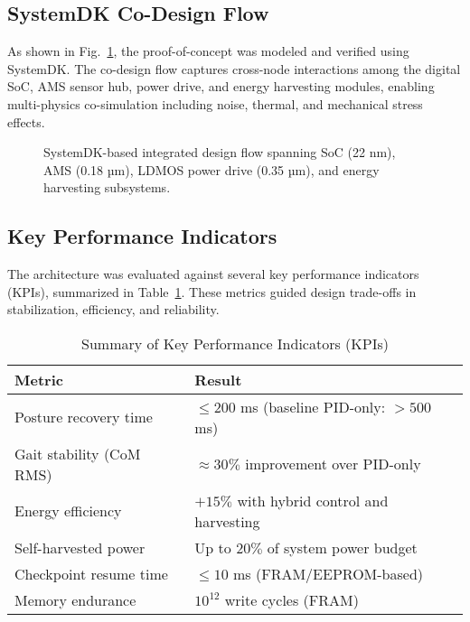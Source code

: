 \subsection{SystemDK Co-Design Flow}
As shown in Fig.~\ref{fig:systemdk_flow}, the proof-of-concept was modeled and verified
using SystemDK. The co-design flow captures cross-node interactions among the digital SoC,
AMS sensor hub, power drive, and energy harvesting modules, enabling multi-physics
co-simulation including noise, thermal, and mechanical stress effects.

\begin{figure}[t]
  \centering
  \caption{SystemDK-based integrated design flow spanning SoC (22 nm), AMS (0.18 µm),
  LDMOS power drive (0.35 µm), and energy harvesting subsystems.}
  \label{fig:systemdk_flow}
\end{figure}

\subsection{Key Performance Indicators}
The architecture was evaluated against several key performance indicators (KPIs),
summarized in Table~\ref{tab:kpi_summary}. These metrics guided design trade-offs
in stabilization, efficiency, and reliability.

\begin{table}[t]
\caption{Summary of Key Performance Indicators (KPIs)}
\label{tab:kpi_summary}
\centering
\renewcommand{\arraystretch}{1.15}
\footnotesize
\begin{tabular}{@{}p{} p{}@{}}
\toprule
\textbf{Metric} & \textbf{Result} \\
\midrule
Posture recovery time & $\leq 200$ ms (baseline PID-only: $>500$ ms) \\
Gait stability (CoM RMS) & $\approx 30\%$ improvement over PID-only \\
Energy efficiency & $+15\%$ with hybrid control and harvesting \\
Self-harvested power & Up to $20\%$ of system power budget \\
Checkpoint resume time & $\leq 10$ ms (FRAM/EEPROM-based) \\
Memory endurance & $10^{12}$ write cycles (FRAM) \\
\bottomrule
\end{tabular}
\end{table}
